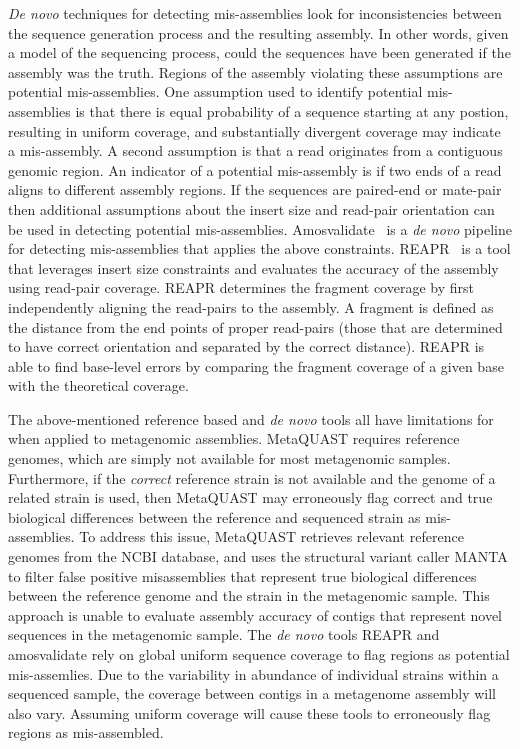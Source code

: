 \documentclass{bioinfo}
\begin{document}
\emph{De novo} techniques for detecting mis-assemblies look for inconsistencies between the sequence generation process and the resulting assembly.
In other words, given a model of the sequencing process, could the sequences have been generated if the assembly was the truth.
Regions of the assembly violating these assumptions are potential mis-assemblies.
One assumption used to identify potential mis-assemblies is that there is equal probability of a sequence starting at any postion, resulting in uniform coverage, and substantially divergent coverage may indicate a mis-assembly.
A second assumption is that a read originates from a contiguous genomic region.  An indicator of a potential mis-assembly is if two ends of a read aligns to different assembly regions.
If the sequences are paired-end or mate-pair then additional assumptions about the insert size and read-pair orientation can be used in detecting potential mis-assemblies. 
Amosvalidate~\citep{amosvalidate2008} is a \emph{de novo} pipeline for detecting mis-assemblies that applies the above constraints. REAPR~\citep{hunt2013reapr} is a tool that leverages insert size constraints and evaluates the accuracy of the assembly using read-pair coverage.
REAPR determines the fragment coverage by first independently aligning the read-pairs to the assembly.
A fragment is defined as the distance from the end points of proper read-pairs (those that are determined to have correct orientation and separated by the correct distance).
REAPR is able to find base-level errors by comparing the fragment coverage of a given base with the theoretical coverage.

The above-mentioned reference based and \emph{de novo} tools all have limitations for when applied to metagenomic assemblies. 
MetaQUAST requires reference genomes, which are simply not available for most metagenomic samples. 
Furthermore, if the \emph{correct} reference strain is not available and the genome of a related strain is used, then MetaQUAST may erroneously flag correct and true biological differences between the reference and sequenced strain as mis-assemblies. 
To address this issue, MetaQUAST retrieves relevant reference genomes from the NCBI database, and uses the structural variant caller MANTA to filter false positive misassemblies that represent true biological differences between the reference genome and the strain in the metagenomic sample. 
This approach is unable to evaluate assembly accuracy of contigs that represent novel sequences in the metagenomic sample. 
The \emph{de novo} tools REAPR and amosvalidate rely on global uniform sequence coverage to flag regions as potential mis-assemlies.
Due to the variability in abundance of individual strains within a sequenced sample, the coverage between contigs in a metagenome assembly will also vary.
Assuming uniform coverage will cause these tools to erroneously flag regions as mis-assembled.
\end{document}
